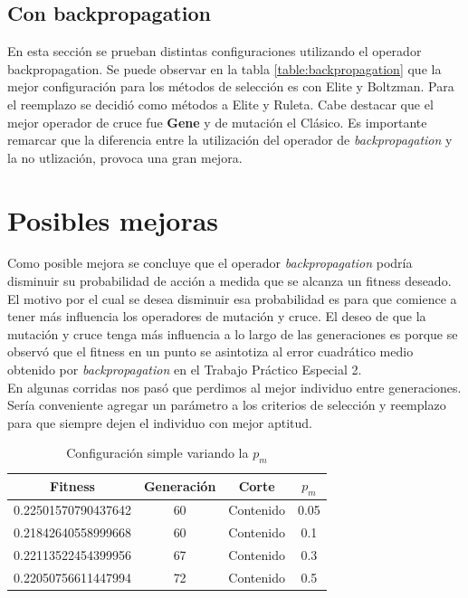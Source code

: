 \documentclass{sig-alternate}
\begin{document}
	\subsection{Con backpropagation}
	En esta sección se prueban distintas configuraciones utilizando el
	operador backpropagation. Se puede observar en la tabla \ref{table:backpropagation} que la mejor configuración para los métodos de selección es con Elite y Boltzman. Para el reemplazo se decidió como métodos a Elite y Ruleta. Cabe destacar que el mejor operador de cruce fue \textbf{Gene} y de mutación el Clásico. Es importante remarcar que la diferencia entre la utilización del operador de \textit{backpropagation} y la no utlización, provoca una gran mejora.
	
\section{Posibles mejoras}

	Como posible mejora se concluye que el operador \textit{backpropagation}
	podría disminuir su probabilidad de acción a medida que se alcanza un
	fitness deseado.
	El motivo por el cual se desea disminuir esa probabilidad es para que
	comience a tener más influencia los operadores de mutación y cruce.
	El deseo de que la mutación y cruce tenga más influencia a lo largo de
	las generaciones es porque se observó que el fitness en un punto se
	asintotiza al error cuadrático medio obtenido por \textit{backpropagation}
	en el Trabajo Práctico Especial 2.\\

	En algunas corridas nos pasó que perdimos al mejor individuo entre
	generaciones. Sería conveniente agregar un parámetro a los criterios
	de selección y reemplazo para que siempre dejen el individuo con mejor
	aptitud.

\onecolumn

\begin{table}[htp]
	\begin{center}
	\begin{tabular}{|c|c|c|c|}
		\hline
	     Fitness & Generación & Corte & $p_{m}$ \\
		\hline
		0.22501570790437642 & 60 & Contenido & 0.05 \\
		0.21842640558999668 & 60 & Contenido & 0.1 \\
		0.22113522454399956 & 67 & Contenido & 0.3 \\ 
		0.22050756611447994 & 72 & Contenido & 0.5 \\
		\hline
	\end{tabular}
	\caption{Configuración simple variando la $p_m$}
	\label{table:simple_mutation_prob}
	\end{center}
\end{table}
\end{document}
